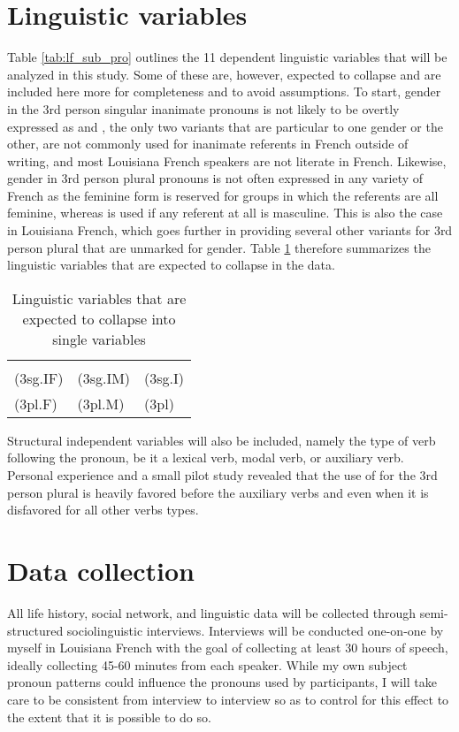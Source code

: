   \section{Linguistic variables}
    Table \ref{tab:lf_sub_pro} outlines the 11 dependent linguistic variables that will be analyzed in this study.
    Some of these are, however, expected to collapse and are included here more for completeness and to avoid assumptions.
    To start, gender in the 3rd person singular inanimate pronouns is not likely to be overtly expressed as  and , the only two variants that are particular to one gender or the other, are not commonly used for inanimate referents in French outside of writing, and most Louisiana French speakers are not literate in French.
    Likewise, gender in 3rd person plural pronouns is not often expressed in any variety of French as the feminine form  is reserved for groups in which the referents are all feminine, whereas  is used if any referent at all is masculine.
    This is also the case in Louisiana French, which goes further in providing several other variants for 3rd person plural that are unmarked for gender.
    Table \ref{tab:lf_pro_collapse} therefore summarizes the linguistic variables that are expected to collapse in the data.

    \begin{table}[tbhp]
      \centering
      \caption{Linguistic variables that are expected to collapse into single variables}
      \label{tab:lf_pro_collapse}
      \begin{tabular}{l @{ + } l @{ $\to$ } l}
        \multicolumn{3}{c}{} \\
        (3sg.IF) & (3sg.IM) & (3sg.I) \\
        (3pl.F)  & (3pl.M)  & (3pl)
      \end{tabular}
    \end{table}

    Structural independent variables will also be included, namely the type of verb following the pronoun, be it a lexical verb, modal verb, or auxiliary verb.
    Personal experience and a small pilot study revealed that the use of  for the 3rd person plural is heavily favored before the auxiliary verbs   and   even when it is disfavored for all other verbs types.

  \section{Data collection}
    All life history, social network, and linguistic data will be collected through semi-structured sociolinguistic interviews.
    Interviews will be conducted one-on-one by myself in Louisiana French with the goal of collecting at least 30 hours of speech, ideally collecting 45-60 minutes from each speaker.
    While my own subject pronoun patterns could influence the pronouns used by participants, I will take care to be consistent from interview to interview so as to control for this effect to the extent that it is possible to do so.

